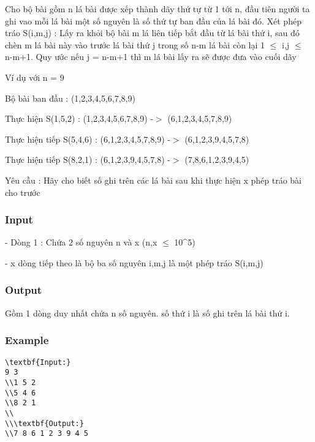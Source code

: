 



   Cho bộ bài gồm n lá bài được xếp thành dãy thứ tự từ 1 tới n, đầu tiên người ta ghi vao mỗi lá bài một số nguyên là số thứ tự ban đầu của lá bài đó. Xét phép tráo S(i,m,j) : Lấy ra khỏi bộ bài m lá liên tiếp bắt đầu từ lá bài thứ i, sau đó chèn m lá bài này vào trước lá bài thứ j trong số n-m lá bài còn lại 1 $\le$ i,j $\le$ n-m+1. Quy ước nếu j = n-m+1 thì m lá bài lấy ra sẽ được đưa vào cuối dãy  

   Ví dụ với n = 9  

   Bộ bài ban đầu : (1,2,3,4,5,6,7,8,9)  

   Thực hiện S(1,5,2) : (1,2,3,4,5,6,7,8,9) -$>$ (6,1,2,3,4,5,7,8,9)  

   Thực hiện tiếp S(5,4,6) : (6,1,2,3,4,5,7,8,9) -$>$ (6,1,2,3,9,4,5,7,8)  

   Thực hiện tiếp S(8,2,1) : (6,1,2,3,9,4,5,7,8) -$>$ (7,8,6,1,2,3,9,4,5)  

   Yêu cầu : Hãy cho biết số ghi trên các lá bài sau khi thực hiện x phép tráo bài cho trước  

\subsubsection{   Input  }

   - Dòng 1 : Chứa 2 số nguyên n và x (n,x  $\le$  10^5)  

   - x dòng tiếp theo là bộ ba số nguyên i,m,j là một phép tráo S(i,m,j)  

\subsubsection{   Output  }

   Gồm 1 dòng duy nhất chứa n số nguyên. số thứ i là số ghi trên lá bài thứ i.  

\subsubsection{   Example  }
\begin{verbatim}
\textbf{Input:}
9 3
\\1 5 2
\\5 4 6
\\8 2 1
\\
\\\textbf{Output:}
\\7 8 6 1 2 3 9 4 5 \end{verbatim}
